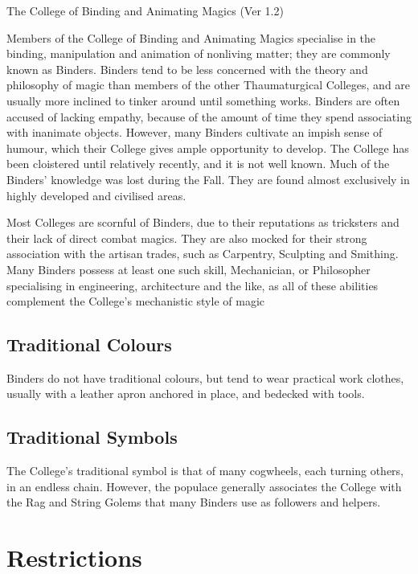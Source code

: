 \begin{Chapter}{The College of Binding and Animating Magics (Ver 1.2)}

Members of the College of Binding and Animating Magics specialise in
the binding, manipulation and animation of nonliving matter; they are
commonly known as Binders.  Binders tend to be less concerned with the
theory and philosophy of magic than members of the other
Thaumaturgical Colleges, and are usually more inclined to tinker
around until something works.  Binders are often accused of lacking
empathy, because of the amount of time they spend associating with
inanimate objects.  However, many Binders cultivate an impish sense of
humour, which their College gives ample opportunity to develop.  The
College has been cloistered until relatively recently, and it is not
well known.  Much of the Binders’ knowledge was lost during the Fall.
They are found almost exclusively in highly developed and civilised
areas.

Most Colleges are scornful of Binders, due to their reputations as
tricksters and their lack of direct combat magics.  They are also
mocked for their strong association with the artisan trades, such as
Carpentry, Sculpting and Smithing.  Many Binders possess at least one
such skill, Mechanician, or Philosopher specialising in engineering,
architecture and the like, as all of these abilities complement the
College’s mechanistic style of magic

\subsection{Traditional Colours}

Binders do not have traditional colours, but tend to wear practical
work clothes, usually with a leather apron anchored in place, and
bedecked with tools.

\subsection{Traditional Symbols}

The College’s traditional symbol is that of many cogwheels, each
turning others, in an endless chain.  However, the populace generally
associates the College with the Rag and String Golems that many
Binders use as followers and helpers.

\section{Restrictions}


\end{Chapter}
